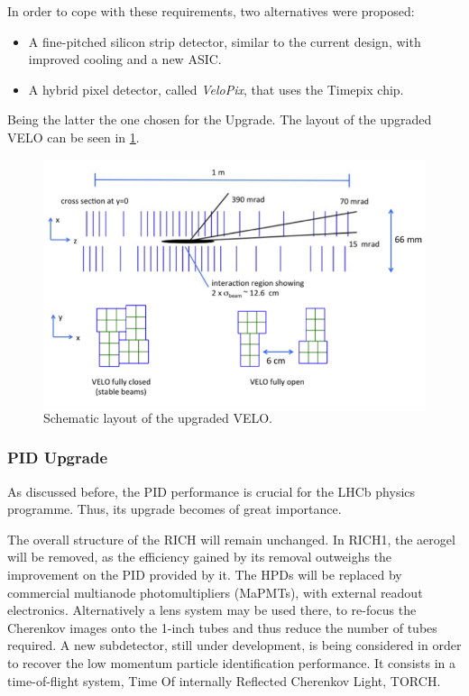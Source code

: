 In order to cope with these requirements, two alternatives were  proposed:
\begin{itemize} 
\item A fine-pitched silicon strip detector, similar to the current design, with improved cooling and a new ASIC.
\item A hybrid pixel detector, called \textit{VeloPix}, that uses the Timepix chip. 
\end{itemize}
Being the latter the one chosen for the Upgrade. The layout of the upgraded VELO can be seen in \ref{fig:VELOUPGRADE}. 


\begin{figure} [htb!]
\begin{center}
\includegraphics[scale=0.7]{figs/VELO_Upgrade.png}
\caption{Schematic layout of the upgraded VELO.\label{fig:VELOUPGRADE}}
\end{center}
\end{figure}
 
\subsubsection{PID Upgrade}

As discussed before, the PID performance is crucial for the LHCb physics programme. Thus, its upgrade becomes of great importance. 

The overall structure of the RICH will remain unchanged. In RICH1, the aerogel will be removed, as the efficiency gained by its removal outweighs the improvement on the PID provided by it. The HPDs will be replaced by commercial multianode photomultipliers (MaPMTs), with external readout electronics. Alternatively a lens system may be used there, to re-focus the Cherenkov images onto the 1-inch tubes and thus reduce the number of tubes required. A new subdetector, still under development, is being considered in order to recover the low momentum particle identification performance. It consists in a time-of-flight system, Time Of internally Reflected Cherenkov Light, TORCH. 

